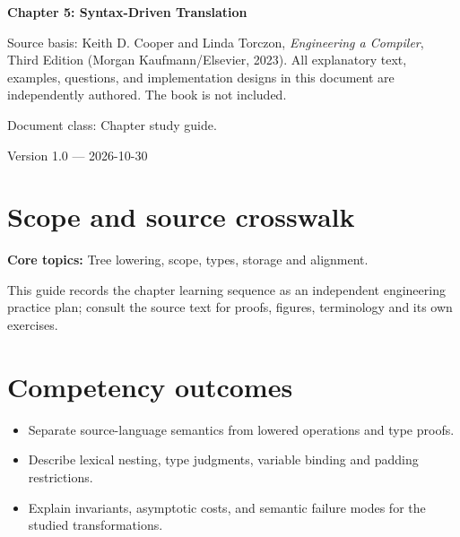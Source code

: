\documentclass[10pt,letterpaper]{article}
\begin{document}
\begin{titlepage}
\centering\vspace*{1.0in}
{\Huge\bfseries\textcolor{CompilerBlue}{Chapter 5: Syntax-Driven Translation}\par}
\vspace{.22in}{\Large Critical reading, original exercises, evidence and review\par}
\vspace{.4in}{\large Compiler Engineering Documentation Suite\par}
\vfill
\begin{minipage}{.86\linewidth}\small
Source basis: Keith D. Cooper and Linda Torczon, \emph{Engineering a Compiler}, Third Edition (Morgan Kaufmann/Elsevier, 2023). All explanatory text, examples, questions, and implementation designs in this document are independently authored. The book is not included.\par\medskip
Document class: Chapter study guide.
\end{minipage}
\vfill\textcolor{CompilerGray}{Version 1.0 --- 2026-10-30}\par
\end{titlepage}
\tableofcontents\clearpage
\section{Scope and source crosswalk}
\textbf{Core topics:} Tree lowering, scope, types, storage and alignment.

This guide records the chapter learning sequence as an independent engineering practice plan; consult the source text for proofs, figures, terminology and its own exercises.

\section{Competency outcomes}
\begin{itemize}
\item Separate source-language semantics from lowered operations and type proofs.
\item Describe lexical nesting, type judgments, variable binding and padding restrictions.
\item Explain invariants, asymptotic costs, and semantic failure modes for the studied transformations.
\end{itemize}
\end{document}
